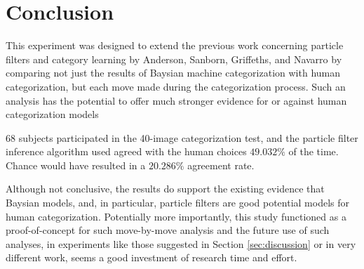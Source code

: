 \section{Conclusion}
\label{sec:conclusion}

This experiment was designed to extend the previous work concerning particle
filters and category learning by Anderson, Sanborn, Griffeths, and Navarro by
comparing not just the results of Baysian machine categorization with human
categorization, but each move made during the categorization process. Such an
analysis has the potential to offer much stronger evidence for or against human
categorization models

68 subjects participated in the 40-image categorization test, and the particle
filter inference algorithm used agreed with the human choices $49.032\%$ of the
time. Chance would have resulted in a $20.286\%$ agreement rate.

Although not conclusive, the results do support the existing evidence that
Baysian models, and, in particular, particle filters are good potential models
for human categorization. Potentially more importantly, this study functioned as
a proof-of-concept for such move-by-move analysis and the future use of such
analyses, in experiments like those suggested in Section \ref{sec:discussion} or
in very different work, seems a good investment of research time and effort.

